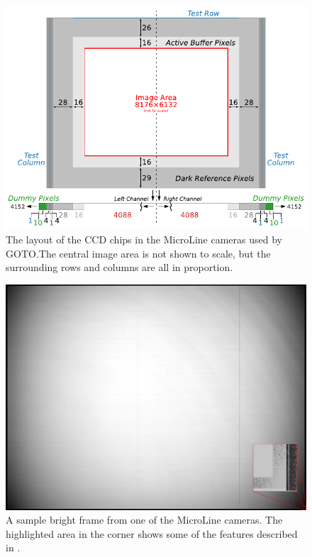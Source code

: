 \begin{colsection}
\begin{figure}[p]
    \begin{center}
        \includegraphics[width=0.85\linewidth]{images/chip}
    \end{center}
    \caption[The layout of the CCD chips in the MicroLine cameras used by GOTO]{
        The layout of the CCD chips in the MicroLine cameras used by GOTO.\@ The central image area is not shown to scale, but the surrounding rows and columns are all in proportion.
    }\label{fig:chip}
\end{figure}

\begin{figure}[p]
    \begin{center}
        \includegraphics[width=0.65\linewidth]{images/sample.png}
    \end{center}
    \caption[A sample bright frame from one of the MicroLine cameras]{
        A sample bright frame from one of the MicroLine cameras. The highlighted area in the corner shows some of the features described in .
    }\label{fig:frame}
\end{figure}

\clearpage
\newpage

\end{colsection}

